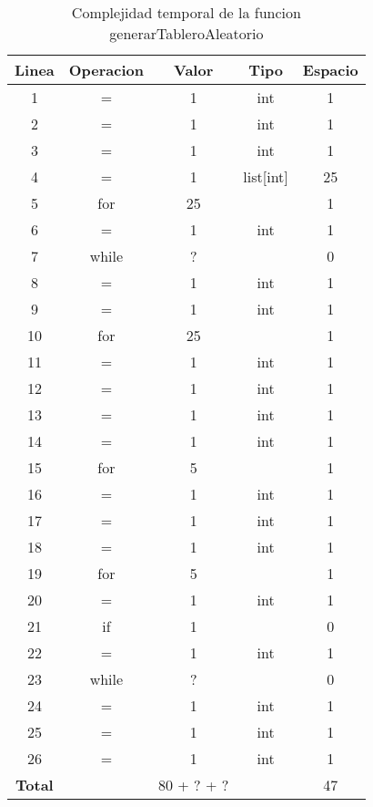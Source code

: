 \documentclass[10pt,twocolumn]{article}
\begin{document}
\begin{table}[h]
\centering
\begin{tabular}{|c|c|c|c|c|}
\hline
\textbf{Linea} & \textbf{Operacion} & \textbf{Valor} & \textbf{Tipo} & \textbf{Espacio} \\
\hline
1 & = & 1 & int & 1 \\
2 & = & 1 & int & 1 \\
3 & = & 1 & int & 1 \\
4 & = & 1 & list[int] & 25 \\
5 & for & 25 &  & 1 \\
6 & = & 1 & int & 1 \\
7 & while & ? &  & 0 \\
8 & = & 1 & int & 1 \\
9 & = & 1 & int & 1 \\
10 & for & 25 &  & 1 \\
11 & = & 1 & int & 1 \\
12 & = & 1 & int & 1 \\
13 & = & 1 & int & 1 \\
14 & = & 1 & int & 1 \\
15 & for & 5 &  & 1 \\
16 & = & 1 & int & 1 \\
17 & = & 1 & int & 1 \\
18 & = & 1 & int & 1 \\
19 & for & 5 &  & 1 \\
20 & = & 1 & int & 1 \\
21 & if & 1 &  & 0 \\
22 & = & 1 & int & 1 \\
23 & while & ? &  & 0 \\
24 & = & 1 & int & 1 \\
25 & = & 1 & int & 1 \\
26 & = & 1 & int & 1 \\
\hline
\textbf{Total} &  & 80 + ? + ? &  & 47 \\
\hline
\end{tabular}
\caption{Complejidad temporal de la funcion generarTableroAleatorio}
\label{tablaComplejidadGenerarTableroAleatorio}
\end{table}
\end{document}
